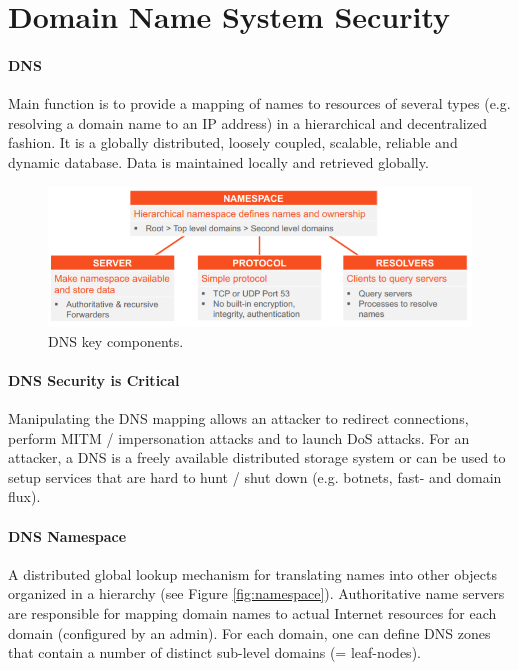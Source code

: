 \section{Domain Name System Security}


\paragraph{DNS}
Main function is to provide a mapping of names to resources of several types (e.g. resolving a domain name to an IP address) in a hierarchical and decentralized fashion. It is a globally distributed, loosely coupled, scalable, reliable and dynamic database. Data is maintained locally and retrieved globally.

\begin{figure}[h]
	\centering
	\includegraphics[scale=0.8]{images/915-dns.PNG}
	\caption{DNS key components.}
	\label{fig:dns}
\end{figure}

\paragraph{DNS Security is Critical}
Manipulating the DNS mapping allows an attacker to redirect connections, perform MITM / impersonation attacks and to launch DoS attacks. For an attacker, a DNS is a freely available distributed storage system or can be used to setup services that are hard to hunt / shut down (e.g. botnets, fast- and domain flux).

\paragraph{DNS Namespace}
A distributed global lookup mechanism for translating names into other objects organized in a hierarchy (see Figure \ref{fig:namespace}). Authoritative name servers are responsible for mapping domain names to actual Internet resources for each domain (configured by an admin). For each domain, one can define DNS zones that contain a number of distinct sub-level domains (= leaf-nodes).

